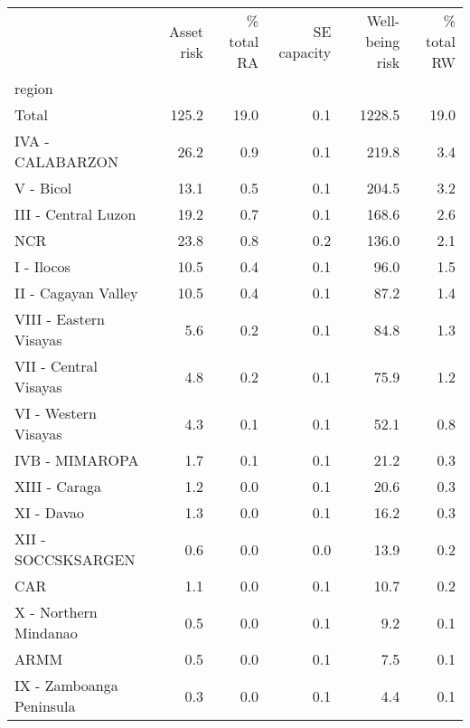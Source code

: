 \begin{tabular}{lrrrrr}
\toprule
{} &  Asset risk &  \% total RA &  SE capacity &  Well-being risk &  \% total RW \\
region                   &             &             &              &                  &             \\
\midrule
Total                    &       125.2 &        19.0 &          0.1 &           1228.5 &        19.0 \\
IVA - CALABARZON         &        26.2 &         0.9 &          0.1 &            219.8 &         3.4 \\
V - Bicol                &        13.1 &         0.5 &          0.1 &            204.5 &         3.2 \\
III - Central Luzon      &        19.2 &         0.7 &          0.1 &            168.6 &         2.6 \\
NCR                      &        23.8 &         0.8 &          0.2 &            136.0 &         2.1 \\
I - Ilocos               &        10.5 &         0.4 &          0.1 &             96.0 &         1.5 \\
II - Cagayan Valley      &        10.5 &         0.4 &          0.1 &             87.2 &         1.4 \\
VIII - Eastern Visayas   &         5.6 &         0.2 &          0.1 &             84.8 &         1.3 \\
VII - Central Visayas    &         4.8 &         0.2 &          0.1 &             75.9 &         1.2 \\
VI - Western Visayas     &         4.3 &         0.1 &          0.1 &             52.1 &         0.8 \\
IVB - MIMAROPA           &         1.7 &         0.1 &          0.1 &             21.2 &         0.3 \\
XIII - Caraga            &         1.2 &         0.0 &          0.1 &             20.6 &         0.3 \\
XI - Davao               &         1.3 &         0.0 &          0.1 &             16.2 &         0.3 \\
XII - SOCCSKSARGEN       &         0.6 &         0.0 &          0.0 &             13.9 &         0.2 \\
CAR                      &         1.1 &         0.0 &          0.1 &             10.7 &         0.2 \\
X - Northern Mindanao    &         0.5 &         0.0 &          0.1 &              9.2 &         0.1 \\
ARMM                     &         0.5 &         0.0 &          0.1 &              7.5 &         0.1 \\
IX - Zamboanga Peninsula &         0.3 &         0.0 &          0.1 &              4.4 &         0.1 \\
\bottomrule
\end{tabular}
